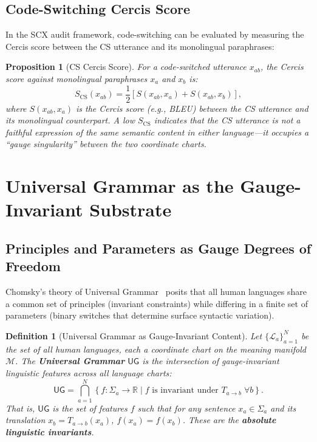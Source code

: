 \documentclass[12pt,a4paper]{article}
\newtheorem{proposition}[theorem]{Proposition}
\newtheorem{definition}[theorem]{Definition}
\theoremstyle{remark}
\newcommand{\R}{\mathbb{R}}
\newcommand{\M}{\mathcal{M}}
\newcommand{\Lang}{\mathcal{L}}
\newcommand{\SCX}{\textsf{SCX}}
\newcommand{\Cercis}{\textsf{Cercis}}
\newcommand{\UG}{\textsf{UG}}
\begin{document}
\subsection{Code-Switching Cercis Score}

In the \SCX{} audit framework, code-switching can be evaluated by
measuring the \Cercis{} score between the CS utterance and its
monolingual paraphrases:

\begin{proposition}[CS Cercis Score]
\label{prop:cs_cercis}
For a code-switched utterance $x_{ab}$, the \Cercis{} score against
monolingual paraphrases $x_a$ and $x_b$ is:
\begin{equation}
  S_{\text{CS}}(x_{ab}) = \frac{1}{2}\left[S(x_{ab}, x_a) + S(x_{ab}, x_b)\right],
\end{equation}
where $S(x_{ab}, x_a)$ is the \Cercis{} score (e.g., BLEU) between
the CS utterance and its monolingual counterpart. A low $S_{\text{CS}}$
indicates that the CS utterance is not a faithful expression of the
same semantic content in either language---it occupies a ``gauge
singularity'' between the two coordinate charts.
\end{proposition}


\section{Universal Grammar as the Gauge-Invariant Substrate}
\label{sec:universal_grammar}

\subsection{Principles and Parameters as Gauge Degrees of Freedom}

Chomsky's theory of Universal Grammar~\cite{chomsky1965aspects,
chomsky1981lectures} posits that all human languages share a common
set of principles (invariant constraints) while differing in a finite
set of parameters (binary switches that determine surface syntactic
variation).

\begin{definition}[Universal Grammar as Gauge-Invariant Content]
\label{def:ug_gauge}
Let $\{\Lang_a\}_{a=1}^N$ be the set of all human languages, each
a coordinate chart on the meaning manifold $\M$. The \textbf{Universal
Grammar} $\UG$ is the intersection of gauge-invariant linguistic
features across all language charts:
\begin{equation}
  \label{eq:ug_invariant}
  \UG = \bigcap_{a=1}^N \left\{ f: \Sigma_a \to \R \;\big|\;
    f \text{ is invariant under } T_{a\to b}\; \forall b \right\}.
\end{equation}
That is, $\UG$ is the set of features $f$ such that for any sentence
$x_a \in \Sigma_a$ and its translation $x_b = T_{a\to b}(x_a)$,
$f(x_a) = f(x_b)$. These are the \textbf{absolute linguistic invariants}.
\end{definition}
\end{document}
